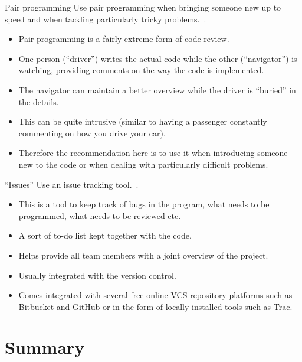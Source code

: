 \documentclass[english]{beamer}
\begin{document}

\begin{frame}{\insertsection}{Pair programming}
  Use pair programming when bringing someone new up to speed and when
  tackling particularly tricky problems.~\cite{Wilson2013}.
  \begin{itemize}
  \item Pair programming is a fairly extreme form of code review.
  \item One person (``driver'') writes the actual code while the other
    (``navigator'') is watching, providing comments on the way the
    code is implemented.
  \item The navigator can maintain a better overview while the driver
    is ``buried'' in the details.
  \item This can be quite intrusive (similar to having a passenger
    constantly commenting on how you drive your car).
  \item Therefore the recommendation here is to use it when
    introducing someone new to the code or when dealing with
    particularly difficult problems.
  \end{itemize}
\end{frame}


\begin{frame}{\insertsection}{``Issues''}
  Use an issue tracking tool.~\cite{Wilson2013}.
  \begin{itemize}
  \item This is a tool to keep track of bugs in the program, what
    needs to be programmed, what needs to be reviewed etc.
  \item A sort of to-do list kept together with the code.
  \item Helps provide all team members with a joint overview of the
    project.
  \item Usually integrated with the version control.
  \item Comes integrated with several free online VCS repository
    platforms such as Bitbucket and GitHub or in the form of locally
    installed tools such as Trac.
  \end{itemize}
\end{frame}


\section{Summary}
\end{document}
